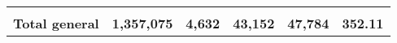 \begin{tabular}{lrcclr}
	& \multicolumn{1}{l}{}                                           & \multicolumn{1}{l}{}                                       & \multicolumn{1}{l}{} &                                                                     & \multicolumn{1}{l}{}                                                         \\
	\rowcolor[HTML]{DDEBF7} 
	\textbf{Total   general}                                       & \textbf{1,357,075}                                             & \multicolumn{1}{r}{\cellcolor[HTML]{DDEBF7}\textbf{4,632}} & \textbf{43,152}      & \textbf{47,784}                                                     & \textbf{352.11}                                                             
\end{tabular}